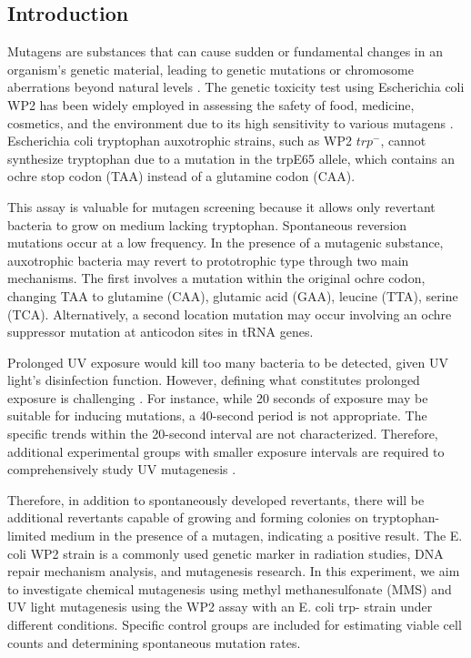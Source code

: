 \documentclass[a4paper,10pt]{article}
\begin{document}
\begin{multicols}{2}
\section{Introduction}


Mutagens are substances that can cause sudden or fundamental changes in an organism's genetic material, leading to genetic mutations or chromosome aberrations beyond natural levels \cite{chaudhary2019mutagenesis}. The genetic toxicity test using Escherichia coli WP2 has been widely employed in assessing the safety of food, medicine, cosmetics, and the environment due to its high sensitivity to various mutagens \cite{brusick1980evaluation}. Escherichia coli tryptophan auxotrophic strains, such as WP2 $trp^-$, cannot synthesize tryptophan due to a mutation in the trpE65 allele, which contains an ochre stop codon (TAA) instead of a glutamine codon (CAA)\cite{ohta2002characterization}.

This assay is valuable for mutagen screening because it allows only revertant bacteria to grow on medium lacking tryptophan. Spontaneous reversion mutations occur at a low frequency. In the presence of a mutagenic substance, auxotrophic bacteria may revert to prototrophic type through two main mechanisms. The first involves a mutation within the original ochre codon, changing TAA to glutamine (CAA), glutamic acid (GAA), leucine (TTA), serine (TCA). Alternatively, a second location mutation may occur involving an ochre suppressor mutation at anticodon sites in tRNA genes.

Prolonged UV exposure would kill too many bacteria to be detected, given UV light's disinfection function. However, defining what constitutes prolonged exposure is challenging \cite{grzesiuk1994frequency}\cite{sobol2002mutations}. For instance, while 20 seconds of exposure may be suitable for inducing mutations, a 40-second period is not appropriate. The specific trends within the 20-second interval are not characterized. Therefore, additional experimental groups with smaller exposure intervals are required to comprehensively study UV mutagenesis \cite{brash1982uv}\cite{ikehata2011mechanisms}.

Therefore, in addition to spontaneously developed revertants, there will be additional revertants capable of growing and forming colonies on tryptophan-limited medium in the presence of a mutagen, indicating a positive result. The E. coli WP2 strain is a commonly used genetic marker in radiation studies, DNA repair mechanism analysis, and mutagenesis research. In this experiment, we aim to investigate chemical mutagenesis using methyl methanesulfonate (MMS) and UV light mutagenesis using the WP2 assay with an E. coli trp- strain under different conditions. Specific control groups are included for estimating viable cell counts and determining spontaneous mutation rates.



\end{multicols}
\end{document}
